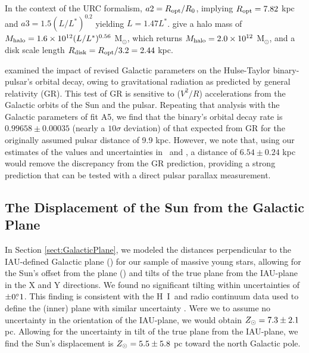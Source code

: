 \documentclass[12pt,preprint]{aastex}
\def\Msun {M$_\odot$}
\def\HI   {H~{\small I}}
\def\d    {\ifmmode {{\rlap{.}}^\circ}\else {${\rlap{.}}^\circ$}\fi}
\def\To    {\ifmmode{\Theta_0}\else{$\Theta_0$}\fi}
\def\Ro    {\ifmmode{R_0}\else{$R_0$}\fi}
\def\Zsun  {\ifmmode {Z_\odot}\else {$Z_\odot$}\fi}
\def\ZIAU  {\ifmmode {Z_{IAU}}\else {$Z_{IAU}$}\fi}
\begin{document}
In the context of the URC formalism, $a2=R_{\rm opt}/\Ro$, implying $R_{\rm opt}=7.82$ kpc and 
$a3=1.5 (L/L^*)^{0.2}$ yielding $L = 1.47 L^*$.  \citet{Persic:96} give a halo mass of
$M_{\rm halo} = 1.6\times10^{12} (L/L^*)^{0.56}$ \Msun, which returns 
$M_{\rm halo} = 2.0\times10^{12}$ \Msun, and a disk scale length 
$R_{\rm disk} = R_{\rm opt}/3.2 =2.44$ kpc.

\citet{Reid:14} examined the impact of revised Galactic parameters on the Hulse-Taylor
binary-pulsar's orbital decay, owing to gravitational radiation as predicted by general 
relativity (GR).  This test of GR is sensitive to ($V^2/R$) accelerations from 
the Galactic orbits of the Sun and the pulsar.   Repeating that analysis with the Galactic
parameters of fit A5, we find that the binary's orbital decay rate is $0.99658\pm0.00035$
(nearly a $10\sigma$ deviation) of that expected from GR for the originally assumed pulsar 
distance of 9.9 kpc.  However, we note that, using our estimates of the values and 
uncertainties in \Ro\ and \To, a distance of $6.54\pm0.24$ kpc would remove 
the discrepancy from the GR prediction, providing a strong prediction that can be tested
with a direct pulsar parallax measurement.


\subsection{The Displacement of the Sun from the Galactic Plane}

In Section \ref{sect:GalacticPlane}, we modeled the distances perpendicular to the 
IAU-defined Galactic plane (\ZIAU) for our sample of massive young stars, allowing for 
the Sun's offset from the plane (\Zsun) and tilts of the true plane from the
IAU-plane in the X and Y directions.   We found no significant tilting
within uncertainties of $\pm 0\d1$.  
This finding is consistent with the \HI\ and radio continuum data used to define 
the (inner) plane with similar uncertainty \citep{Gum:60}.
Were we to assume no uncertainty in the orientation of the IAU-plane, 
we would obtain $\Zsun=7.3\pm2.1$ pc.
Allowing for the uncertainty in tilt of the true plane from the IAU-plane,
we find the Sun's displacement is $\Zsun=5.5\pm5.8$ pc toward the north Galactic pole. 
\end{document}
